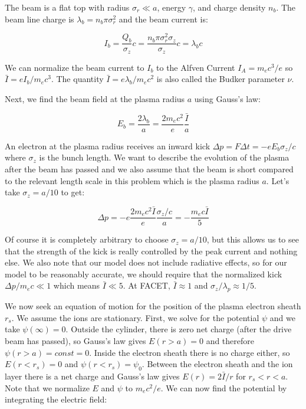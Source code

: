 \documentclass[aps,prl,preprint,groupedaddress]{revtex4-1}
\begin{document}
The beam is a flat top with radius $\sigma_r \ll a$, energy $\gamma$, and charge density $n_b$. The beam line charge is $\lambda_b = n_b \pi \sigma_r^2$ and the beam current is:

\begin{equation}\label{eq:I_beam}
I_b = \frac{Q_b}{\sigma_z}c = \frac{n_b \pi \sigma_r^2 \sigma_z}{\sigma_z}c = \lambda_b c
\end{equation}

We can normalize the beam current to $I_b$ to the Alfven Current $I_A = m_e c^3/e$ so $\bar{I} = e I_b /m_e c^3$. The quantity $\bar{I} = e \lambda_b/m_e c^2$ is also called the Budker parameter $\nu$. 

Next, we find the beam field at the plasma radius $a$ using Gauss's law:

\begin{equation}\label{eq:E_beam}
E_b = \frac{2 \lambda_b}{a} = \frac{2m_e c^2}{e} \frac{\bar{I}}{a}
\end{equation}

An electron at the plasma radius receives an inward kick $\Delta p = F \Delta t = -e E_b \sigma_z/c$ where $\sigma_z$ is the bunch length. We want to describe the evolution of the plasma after the beam has passed and we also assume that the beam is short compared to the relevant length scale in this problem which is the plasma radius $a$. Let's take $\sigma_z = a/10$ to get:

\begin{equation}\label{eq:norm_kick}
\Delta p = -e \frac{2m_e c^2 \bar{I}}{e}\frac{\sigma_z/c}{a} = -\frac{m_e c \bar{I}}{5}
\end{equation}  

Of course it is completely arbitrary to choose $\sigma_z = a/10$, but this allows us to see that the strength of the kick is really controlled by the peak current and nothing else. We also note that our model does not include radiative effects, so for our model to be reasonably accurate, we should require that the normalized kick $\Delta p/m_e c \ll 1$ which means $\bar{I} \ll 5$. At FACET, $\bar{I} \approx 1$ and $\sigma_z/\lambda_p \approx 1/5$. 

We now seek an equation of motion for the position of the plasma electron sheath $r_s$. We assume the ions are stationary. First, we solve for the potential $\psi$ and we take $\psi(\infty) = 0$. Outside the cylinder, there is zero net charge (after the drive beam has passed), so Gauss's law gives $E(r > a) = 0$ and therefore $\psi(r > a) = const = 0$. Inside the electron sheath there is no charge either, so $E(r < r_s) = 0$ and $\psi(r < r_s) = \psi_0$. Between the electron sheath and the ion layer there is a net charge and Gauss's law gives $E(r) = 2\bar{I}/r$ for $r_s < r < a$. Note that we normalize $E$ and $\psi$ to $m_e c^2/e$. We can now find the potential by integrating the electric field:
\end{document}
